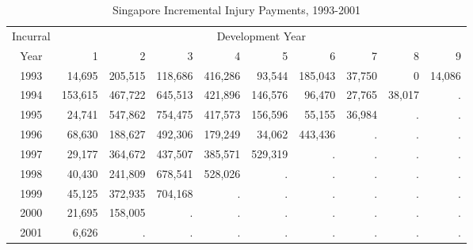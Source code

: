 \begin{center}  \begin{table}[h]
\caption{\label{T19:SingaporeInjuryRunOff} Singapore Incremental
Injury Payments, 1993-2001} 
\begin{tabular}{c|rrrrrrrrr}
  \hline
Incurral&\multicolumn{9}{c}{Development Year }     \\
Year & 1 & 2 &3 &4 & 5 & 6 & 7 & 8 & 9 \\
         \hline
1993 &    14,695 &    205,515 &    118,686 &    416,286 &     93,544 &    185,043 &     37,750 &     0 &14,086 \\
1994 &   153,615 &    467,722 &    645,513 &    421,896 &    146,576 &     96,470 &     27,765 &38,017 &   . \\
1995 &    24,741 &    547,862 &    754,475 &    417,573 &    156,596 &     55,155 &     36,984 &  . &  . \\
1996 &    68,630 &    188,627 &    492,306 &    179,249 &     34,062 &    443,436 &          . &  . &   . \\
1997 &    29,177 &    364,672 &    437,507 &    385,571 &    529,319 &          . &          . & . &  . \\
1998 &    40,430 &    241,809 &    678,541 &    528,026 &          . &          . &          . & . &  . \\
1999 &    45,125 &    372,935 &    704,168 &          . &          . &          . &          . & . &  . \\
2000 &    21,695 &    158,005 &          . &          . &          . &          . &          . & . & . \\
2001 &     6,626 &          . &          . &          . &          . &          . &          . &  . & . \\
        \hline
\end{tabular}
\end{table}  \end{center}


